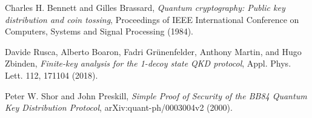 \documentclass[prl,twocolumn]{revtex4-1}
\begin{document}
\begin{thebibliography}{99}
Charles H. Bennett and Gilles Brassard, \textit{Quantum cryptography: Public key distribution and coin tossing}, Proceedings of IEEE International Conference on Computers, Systems and Signal Processing (1984).

Davide Rusca, Alberto Boaron, Fadri Grünenfelder, Anthony Martin, and Hugo Zbinden, \textit{Finite-key analysis for the 1-decoy state QKD protocol}, Appl. Phys. Lett. 112, 171104 (2018).

Peter W. Shor and John Preskill, \textit{Simple Proof of Security of the BB84 Quantum Key Distribution Protocol}, arXiv:quant-ph/0003004v2 (2000).

\end{thebibliography}
\end{document}
